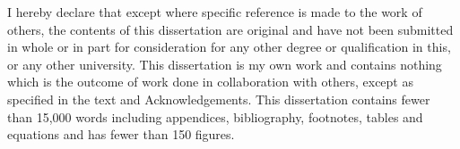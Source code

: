 
\begin{declaration}

I hereby declare that except where specific reference is made to the work of 
others, the contents of this dissertation are original and have not been 
submitted in whole or in part for consideration for any other degree or 
qualification in this, or any other university. This dissertation is my own 
work and contains nothing which is the outcome of work done in collaboration 
with others, except as specified in the text and Acknowledgements. This 
dissertation contains fewer than 15,000 words including appendices, 
bibliography, footnotes, tables and equations and has fewer than 150 figures.


\end{declaration}